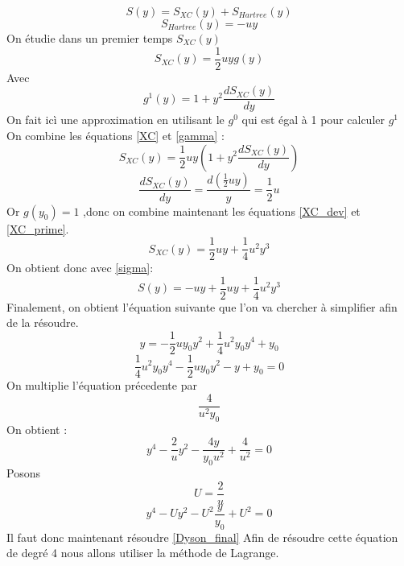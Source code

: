 \documentclass[12pt]{article}
\begin{document}
\begin{equation}
\label{sigma}
	S(y) = S_{XC}(y) + S_{Hartree}(y)
\end{equation}
\begin{equation}
\label{Hartree} 
	S_{Hartree}(y) = -uy
\end{equation}
On \'etudie dans un premier temps $S_{XC}(y)$ 
\begin{equation}
\label{XC} 
	S_{XC}(y) = \frac{1}{2} u y g(y)
\end{equation}
Avec
\begin{equation} 
\label{gamma} 
	g^1(y) = 1 + y^2 \frac{dS_{XC}(y)}{dy} 
\end{equation}
On fait ic\`i une approximation en utilisant le $g^0$ qui est \'egal \`a 1 pour calculer $g^1$
On combine les \'equations \ref{XC} et \ref{gamma} : 
\begin{equation} 
\label{XC_dev}
	S_{XC}(y) = \frac{1}{2} u y (1 + y^2 \frac{dS_{XC}(y)}{dy})
\end{equation}
\begin{equation} 
\label{XC_prime} 
	\frac{dS_{XC}(y)}{dy} = \frac{d(\frac{1}{2} u y )}{y} = \frac{1}{2} u 
\end{equation}
Or $g(y_0) = 1$ ,donc on combine maintenant les \'equations \ref{XC_dev}  et \ref{XC_prime}.
\begin{equation}
\label{XC_final} 
	S_{XC}(y) = \frac{1}{2} u y + \frac{1}{4} u^2 y^3 
\end{equation}
On obtient donc avec \ref{sigma}: 
\begin{equation}
\label{Sigma_final} 
	S(y) = -uy +  \frac{1}{2} u y + \frac{1}{4} u^2 y^3 
\end{equation}
Finalement, on obtient l'\'equation suivante que l'on va chercher \`a simplifier afin de la r\'esoudre.
\begin{equation}
	y = -\frac{1}{2} u y_0 y^2 + \frac{1}{4} u^2 y_0 y^4 + y_0
\end{equation}
\begin{equation}
	\frac{1}{4} u^2 y_0 y^4 -\frac{1}{2} u y_0 y^2 - y + y_0 = 0
\end{equation}
On multiplie l'\'equation pr\'ecedente par $$ \frac{4}{u^2 y_0}$$
On obtient : 
\begin{equation}
	y^4 -\frac{2}{u} y^2 - \frac{4y}{y_0  u^2} + \frac{4}{u^2} = 0
\end{equation}
Posons $$ U = \frac{2}{u}$$
\begin{equation}
\label{Dyson_final} 
	y^4 - U y^2 - U^2\frac{y}{y_0} + U^2 = 0
\end{equation}
Il faut donc maintenant r\'esoudre \ref{Dyson_final}
%
Afin de résoudre cette \'equation de degr\'e 4 nous allons utiliser la m\'ethode de Lagrange.
\end{document}
